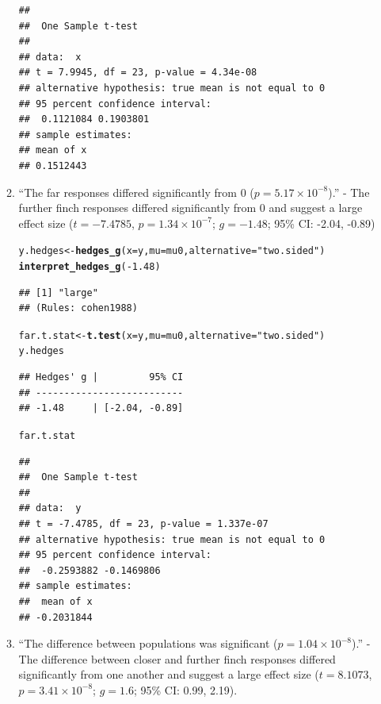 \documentclass{article}\usepackage[]{graphicx}\usepackage[]{xcolor}
\makeatletter
\newcommand{\hlnum}[1]{\textcolor[rgb]{0.686,0.059,0.569}{#1}}%
\newcommand{\hlsng}[1]{\textcolor[rgb]{0.192,0.494,0.8}{#1}}%
\newcommand{\hlopt}[1]{\textcolor[rgb]{0,0,0}{#1}}%
\newcommand{\hldef}[1]{\textcolor[rgb]{0.345,0.345,0.345}{#1}}%
\newcommand{\hlkwb}[1]{\textcolor[rgb]{0.69,0.353,0.396}{#1}}%
\newcommand{\hlkwc}[1]{\textcolor[rgb]{0.333,0.667,0.333}{#1}}%
\newcommand{\hlkwd}[1]{\textcolor[rgb]{0.737,0.353,0.396}{\textbf{#1}}}%
\newenvironment{kframe}{%
 \def\at@end@of@kframe{}%
 \ifinner\ifhmode%
  \def\at@end@of@kframe{\end{minipage}}%
  \begin{minipage}{\columnwidth}%
 \fi\fi%
 \def\FrameCommand##1{\hskip\@totalleftmargin \hskip-\fboxsep
 \colorbox{shadecolor}{##1}\hskip-\fboxsep
     \hskip-\linewidth \hskip-\@totalleftmargin \hskip\columnwidth}%
 \MakeFramed {\advance\hsize-\width
   \@totalleftmargin\z@ \linewidth\hsize
   \@setminipage}}%
 {\par\unskip\endMakeFramed%
 \at@end@of@kframe}
\newenvironment{knitrout}{}{} %
\makeatother
\begin{document}
\begin{enumerate}
\begin{enumerate}
\begin{knitrout}
\begin{kframe}
\begin{verbatim}
## 
## 	One Sample t-test
## 
## data:  x
## t = 7.9945, df = 23, p-value = 4.34e-08
## alternative hypothesis: true mean is not equal to 0
## 95 percent confidence interval:
##  0.1121084 0.1903801
## sample estimates:
## mean of x 
## 0.1512443
\end{verbatim}
\end{kframe}
\end{knitrout}
  \item ``The far responses differed significantly from 0 ($p=5.17 \times 10^{-8}$).''  - The further finch responses differed significantly from 0 and suggest a large effect size ($t=-7.4785$, $p=1.34 \times  10^{-7}$; $g=-1.48$; 95\% CI: -2.04, -0.89)
\begin{knitrout}\scriptsize
{}\color{fgcolor}\begin{kframe}
\begin{alltt}
\hldef{y.hedges} \hlkwb{<-} \hlkwd{hedges_g}\hldef{(}\hlkwc{x} \hldef{= y,} \hlkwc{mu} \hldef{= mu0,} \hlkwc{alternative} \hldef{=} \hlsng{"two.sided"}\hldef{)}
\hlkwd{interpret_hedges_g}\hldef{(}\hlopt{-}\hlnum{1.48}\hldef{)}
\end{alltt}
\begin{verbatim}
## [1] "large"
## (Rules: cohen1988)
\end{verbatim}
\begin{alltt}
\hldef{far.t.stat} \hlkwb{<-} \hlkwd{t.test}\hldef{(}\hlkwc{x}\hldef{=y,} \hlkwc{mu} \hldef{= mu0,} \hlkwc{alternative} \hldef{=} \hlsng{"two.sided"}\hldef{)}
\hldef{y.hedges}
\end{alltt}
\begin{verbatim}
## Hedges' g |         95% CI
## --------------------------
## -1.48     | [-2.04, -0.89]
\end{verbatim}
\begin{alltt}
\hldef{far.t.stat}
\end{alltt}
\begin{verbatim}
## 
## 	One Sample t-test
## 
## data:  y
## t = -7.4785, df = 23, p-value = 1.337e-07
## alternative hypothesis: true mean is not equal to 0
## 95 percent confidence interval:
##  -0.2593882 -0.1469806
## sample estimates:
##  mean of x 
## -0.2031844
\end{verbatim}
\end{kframe}
\end{knitrout}
  \item ``The difference between populations was significant ($p=1.04 \times10^{-8}$).'' - The difference between closer and further finch responses differed significantly from one another and suggest a large effect size ($t=8.1073$, $p=3.41 \times  10^{-8}$; $g=1.6$; 95\% CI: 0.99, 2.19).

\end{enumerate}
\end{enumerate}
\end{document}
